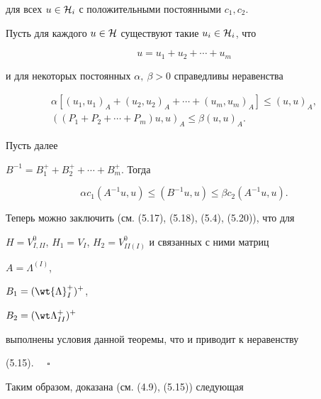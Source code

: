 для всех $u\in {\cal H}_i$ с положительными постоянными $c_1,c_2$.





\begin{thms} 


Пусть для каждого $u\in{\cal H}$ существуют такие $u_i \in{\cal H}_i$, что


$$


u=u_1+u_2+\dotsb+u_m


$$


и для некоторых постоянных $\alpha,\ \beta>0$ справедливы неравенства


\begin{gather*}


\alpha [(u_1,u_1)_A+(u_2,u_2)_A+\dotsb+(u_m,u_m)_A]\leq (u,u)_A, \\ 


((P_1+P_2+\dotsb+P_m)u,u)_A\leq \beta (u,u)_A.


\end{gather*}


Пусть далее 


$B^{-1}=B^+_1+B^+_2+\dotsb+B^+_m$. Тогда 


$$


{\alpha}c_1(A^{-1}u,u)\leq (B^{-1}u,u)\leq {\beta}c_2(A^{-1}u,u).


$$


\end{thms}





Теперь можно заключить (см. (5.17), (5.18), (5.4), (5.20)), что для


$H=V^0_{I,II}$, $H_1=V_I$, $H_2=V^0_{II(I)}$ и связанных с ними матриц 


$A=\Lambda^{(I)}$, 


$B_1=(\wt{\Lambda}_I^+)^+_{\phantom{I}}$,


$B_2=(\wt\Lambda^+_{II})^+_{\phantom{I}}$ 




выполнены условия данной теоремы, что и приводит к неравенству 


(5.15). $\quad\square$


\medskip





Таким образом, доказана (см. (4.9), (5.15)) следующая 





